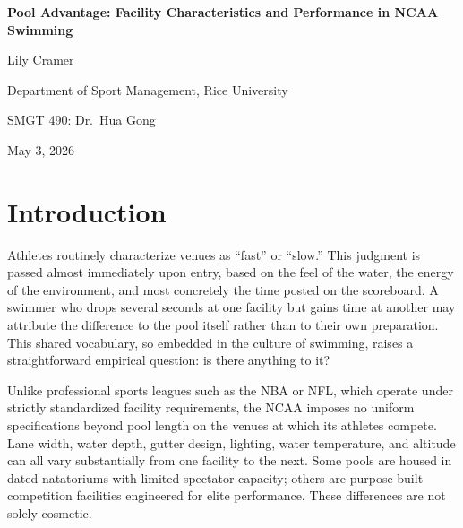 \documentclass[12pt]{article}
\begin{document}
\begin{titlepage}
  \centering
  \vspace*{2in}

  {\large\bfseries Pool Advantage: Facility Characteristics and Performance
  in NCAA Swimming\par}
  \vspace{1cm}

  {\large Lily Cramer\par}
  \vspace{0.3cm}
  {\large Department of Sport Management, Rice University\par}
  \vspace{0.3cm}
  {\large SMGT 490: Dr.\ Hua Gong\par}
  \vspace{0.3cm}
  {\large May 3, 2026\par}

  \vfill
\end{titlepage}

\setcounter{page}{1}

\tableofcontents
\newpage

\section{Introduction}

Athletes routinely characterize venues as ``fast'' or ``slow.'' This judgment
is passed almost immediately upon entry, based on the feel of the water, the
energy of the environment, and most concretely the time posted on the
scoreboard. A swimmer who drops several seconds at one facility but gains time
at another may attribute the difference to the pool itself rather than to their
own preparation. This shared vocabulary, so embedded in the culture of
swimming, raises a straightforward empirical question: is there anything to it?

Unlike professional sports leagues such as the NBA or NFL, which operate under
strictly standardized facility requirements, the NCAA imposes no uniform
specifications beyond pool length on the venues at which its athletes compete.
Lane width, water depth, gutter design, lighting, water temperature, and
altitude can all vary substantially from one facility to the next. Some pools
are housed in dated natatoriums with limited spectator capacity; others are
purpose-built competition facilities engineered for elite performance. These
differences are not solely cosmetic.
\end{document}
